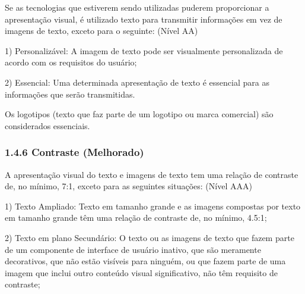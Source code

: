 \documentclass[a4paper]{article}
\begin{document}
\begin{titlepage}
Se as tecnologias que estiverem sendo utilizadas puderem proporcionar a apresentação visual, é utilizado texto para transmitir informações em vez de imagens de texto, exceto para o seguinte: (Nível AA)\\

\hspace{.1\textwidth} %
\begin{minipage}{.85\textwidth}
	1) Personalizável: A imagem de texto pode ser visualmente personalizada de acordo com os requisitos do usuário;\\
\end{minipage}

\hspace{.1\textwidth} %
\begin{minipage}{.85\textwidth}
	2) Essencial: Uma determinada apresentação de texto é essencial para as informações que serão transmitidas.\\
\end{minipage}

Os logotipos (texto que faz parte de um logotipo ou marca comercial) são considerados essenciais.

\subsubsection{1.4.6 Contraste (Melhorado)}

A apresentação visual do texto e imagens de texto tem uma relação de contraste de, no mínimo, 7:1, exceto para as seguintes situações: (Nível AAA)\\

\hspace{.1\textwidth} %
\begin{minipage}{.85\textwidth}
	1) Texto Ampliado: Texto em tamanho grande e as imagens compostas por texto em tamanho grande têm uma relação de contraste de, no mínimo, 4.5:1;\\
\end{minipage}

\hspace{.1\textwidth} %
\begin{minipage}{.85\textwidth}
	2) Texto em plano Secundário: O texto ou as imagens de texto que fazem parte de um componente de interface de usuário inativo, que são meramente decorativos, que não estão visíveis para ninguém, ou que fazem parte de uma imagem que inclui outro conteúdo visual significativo, não têm requisito de contraste;\\
\end{minipage}


\end{titlepage}
\end{document}
